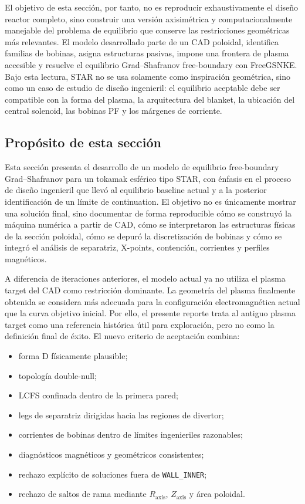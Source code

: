 \documentclass[11pt,a4paper]{article}
\begin{document}
El objetivo de esta sección, por tanto, no es reproducir exhaustivamente el diseño reactor completo,
sino construir una versión axisimétrica y computacionalmente manejable del problema de equilibrio
que conserve las restricciones geométricas más relevantes. El modelo desarrollado parte de un CAD
poloidal, identifica familias de bobinas, asigna estructuras pasivas, impone una frontera de plasma
accesible y resuelve el equilibrio Grad--Shafranov free-boundary con FreeGSNKE. Bajo esta lectura,
STAR no se usa solamente como inspiración geométrica, sino como un caso de estudio de diseño
ingenieril: el equilibrio aceptable debe ser compatible con la forma del plasma, la arquitectura del
blanket, la ubicación del central solenoid, las bobinas PF y los márgenes de corriente.

\subsection{Propósito de esta sección}
Esta sección presenta el desarrollo de un modelo de equilibrio free-boundary Grad--Shafranov
para un tokamak esférico tipo STAR, con énfasis en el proceso de diseño ingenieril que llevó
al equilibrio baseline actual y a la posterior identificación de un límite de continuation. El
objetivo no es únicamente mostrar una solución final, sino documentar de forma reproducible cómo
se construyó la máquina numérica a partir de CAD, cómo se interpretaron las estructuras físicas
de la sección poloidal, cómo se depuró la discretización de bobinas y cómo se integró el análisis
de separatriz, X-points, contención, corrientes y perfiles magnéticos.

A diferencia de iteraciones anteriores, el modelo actual ya no utiliza el plasma target del CAD
como restricción dominante. La geometría del plasma finalmente obtenida se considera más adecuada
para la configuración electromagnética actual que la curva objetivo inicial. Por ello, el presente
reporte trata al antiguo plasma target como una referencia histórica útil para exploración, pero
no como la definición final de éxito. El nuevo criterio de aceptación combina:

\begin{itemize}
    \item forma D físicamente plausible;
    \item topología double-null;
    \item LCFS confinada dentro de la primera pared;
    \item legs de separatriz dirigidas hacia las regiones de divertor;
    \item corrientes de bobinas dentro de límites ingenieriles razonables;
    \item diagnósticos magnéticos y geométricos consistentes;
    \item rechazo explícito de soluciones fuera de \texttt{WALL\_INNER};
    \item rechazo de saltos de rama mediante $R_{\mathrm{axis}}$, $Z_{\mathrm{axis}}$ y área poloidal.
\end{itemize}
\end{document}
